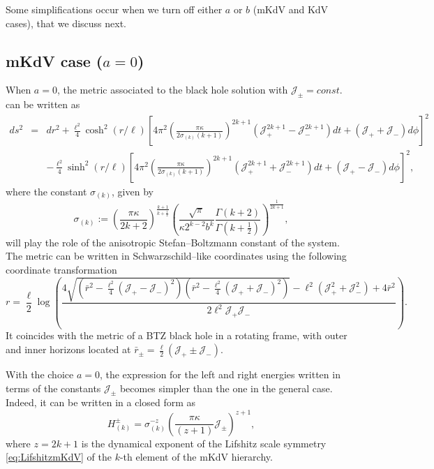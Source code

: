 \documentclass[letterpaper,11pt,oneside]{book}
\begin{document}
Some simplifications occur when we turn off either $a$ or $b$ (mKdV
and KdV cases), that we discuss next.

\subsection{mKdV case ($a=0$)}

When $a=0$, the metric associated to the black hole solution with
$\mathcal{J_{\pm}}=const.$ can be written as
\begin{equation}
	\begin{array}{ccc}
		ds^{2} & = & dr^{2}+\frac{\ell^{2}}{4}\cosh^{2}\left(r/\ell\right)\left[4\pi^{2}\left(\frac{\pi\kappa}{2\sigma_{\left(k\right)}\left(k+1\right)}\right)^{2k+1}\left(\mathcal{J}_{+}^{2k+1}-\mathcal{J}_{-}^{2k+1}\right)dt+\left(\mathcal{J}_{+}+\mathcal{J}_{-}\right)d\phi\right]^{2}\\
		&  & -\frac{\ell^{2}}{4}\sinh^{2}\left(r/\ell\right)\left[4\pi^{2}\left(\frac{\pi\kappa}{2\sigma_{\left(k\right)}\left(k+1\right)}\right)^{2k+1}\left(\mathcal{J}_{+}^{2k+1}+\mathcal{J}_{-}^{2k+1}\right)dt+\left(\mathcal{J}_{+}-\mathcal{J}_{-}\right)d\phi\right]^{2},
	\end{array}\label{eq:metriccompleta-1-1-1}
\end{equation}
where the constant $\sigma_{\left(k\right)}$, given by
\[
\sigma_{\left(k\right)}:=\left(\frac{\pi\kappa}{2k+2}\right)^{\frac{k+1}{k+\frac{1}{2}}}\left(\frac{\sqrt{\pi}}{\kappa2^{k-2}b^{k}}\frac{\Gamma\left(k+2\right)}{\Gamma\left(k+\frac{1}{2}\right)}\right)^{\frac{1}{2k+1}},
\]
will play the role of the anisotropic Stefan--Boltzmann constant
of the system. The metric can be written in Schwarzschild--like coordinates
using the following coordinate transformation
\begin{equation}
	r=\frac{\ell}{2}\log\left(\frac{4\sqrt{\left(\bar{r}^{2}-\frac{\ell^{2}}{4}\left(\mathcal{J}_{+}-\mathcal{J}_{-}\right)^{2}\right)\left(\bar{r}^{2}-\frac{\ell^{2}}{4}\left(\mathcal{J}_{+}+\mathcal{J}_{-}\right)^{2}\right)}-\ell^{2}\left(\mathcal{J}_{+}^{2}+\mathcal{J}_{-}^{2}\right)+4\bar{r}^{2}}{2\ell^{2}\mathcal{J}_{+}\mathcal{J}_{-}}\right).\label{eq:changeinr}
\end{equation}
It coincides with the metric of a BTZ black hole in a rotating frame,
with outer and inner horizons located at $\bar{r}_{\pm}=\frac{\ell}{2}\left(\mathcal{J}_{+}\pm\mathcal{J}_{-}\right)$.

With the choice $a=0$, the expression for the left and right energies
written in terms of the constants $\mathcal{J}_{\pm}$ becomes simpler
than the one in the general case. Indeed, it can be written in a closed
form as
\begin{equation}
	H_{\left(k\right)}^{\pm}=\sigma_{\left(k\right)}^{-z}\left(\frac{\pi\kappa}{\left(z+1\right)}\mathcal{J}_{\pm}\right)^{z+1},\label{eq:HdeJmKdV}
\end{equation}
where $z=2k+1$ is the dynamical exponent of the Lifshitz scale symmetry
\eqref{eq:LifshitzmKdV} of the $k$-th element of the mKdV hierarchy.
\end{document}
